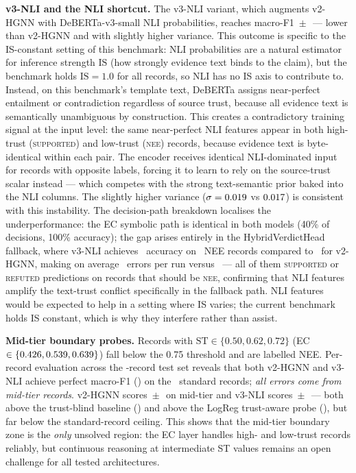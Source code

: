\documentclass[conference]{IEEEtran}
\begin{document}
\textbf{v3-NLI and the NLI shortcut.} The v3-NLI variant, which augments v2-HGNN with DeBERTa-v3-small NLI probabilities, reaches macro-F1 \VthreeMF\,$\pm$\,\VthreeStd\ --- lower than v2-HGNN and with slightly higher variance. This outcome is specific to the IS-constant setting of this benchmark: NLI probabilities are a natural estimator for inference strength $\mathrm{IS}$ (how strongly evidence text binds to the claim), but the benchmark holds $\mathrm{IS}=1.0$ for all records, so NLI has no IS axis to contribute to. Instead, on this benchmark's template text, DeBERTa assigns near-perfect entailment or contradiction regardless of source trust, because all evidence text is semantically unambiguous by construction. This creates a contradictory training signal at the input level: the same near-perfect NLI features appear in both high-trust (\textsc{supported}) and low-trust (\textsc{nee}) records, because evidence text is byte-identical within each pair. The encoder receives identical NLI-dominated input for records with opposite labels, forcing it to learn to rely on the source-trust scalar instead — which competes with the strong text-semantic prior baked into the NLI columns. The slightly higher variance ($\sigma=0.019$ vs $0.017$) is consistent with this instability. The decision-path breakdown localises the underperformance: the EC symbolic path is identical in both models (40\% of decisions, 100\% accuracy); the gap arises entirely in the HybridVerdictHead fallback, where v3-NLI achieves \VthreeVHAcc\ accuracy on \VHTotal\ NEE records compared to \VtwoVHAcc\ for v2-HGNN, making on average \VthreeVHErr\ errors per run versus \VtwoVHErr\ — all of them \textsc{supported} or \textsc{refuted} predictions on records that should be \textsc{nee}, confirming that NLI features amplify the text-trust conflict specifically in the fallback path. NLI features would be expected to help in a setting where IS varies; the current benchmark holds IS constant, which is why they interfere rather than assist.

\textbf{Mid-tier boundary probes.} Records with $\mathrm{ST}\in\{0.50,0.62,0.72\}$ (EC $\in\{0.426,0.539,0.639\}$) fall below the 0.75 threshold and are labelled NEE. Per-record evaluation across the \NTest-record test set reveals that both v2-HGNN and v3-NLI achieve perfect macro-F1 (\VtwoStdMF) on the \NStandard\ standard records; \emph{all errors come from mid-tier records}. v2-HGNN scores \VtwoMidMF\,$\pm$\,\VtwoMidStd\ on mid-tier and v3-NLI scores \VthreeMidMF\,$\pm$\,\VthreeMidStd\ --- both above the trust-blind baseline (\MidTierBlindMF) and above the LogReg trust-aware probe (\MidTierMF), but far below the standard-record ceiling. This shows that the mid-tier boundary zone is the \emph{only} unsolved region: the EC layer handles high- and low-trust records reliably, but continuous reasoning at intermediate ST values remains an open challenge for all tested architectures.
\end{document}
